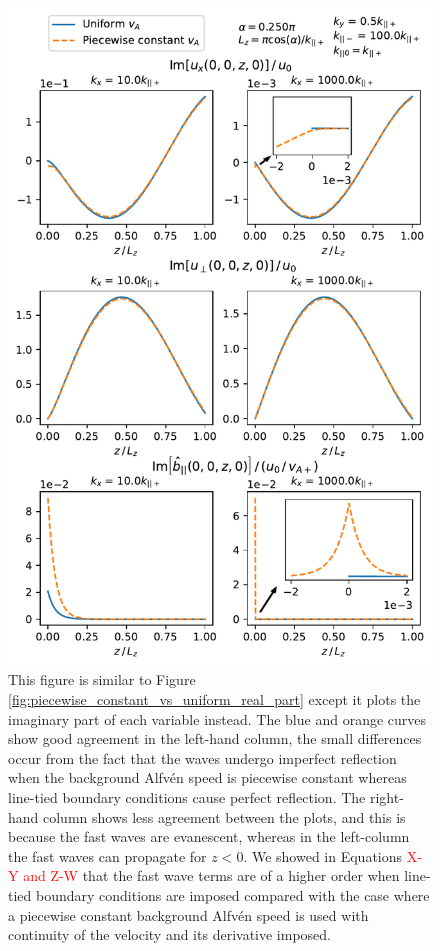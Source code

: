 \begin{figure}
    \centering
    \vspace{-20pt}
    \includegraphics[width=\textwidth,height=0.8\textheight,keepaspectratio]{figures/chapter04/piecewise_constant_vs_uniform_imag_part.pdf}
    \vspace{-10pt}
    \caption{This figure is similar to Figure \ref{fig:piecewise_constant_vs_uniform_real_part} except it plots the imaginary part of each variable instead. The blue and orange curves show good agreement in the left-hand column, the small differences occur from the fact that the waves undergo imperfect reflection when the background Alfv\'en speed is piecewise constant whereas line-tied boundary conditions cause perfect reflection. The right-hand column shows less agreement between the plots, and this is because the fast waves are evanescent, whereas in the left-column the fast waves can propagate for $z<0$. We showed in Equations \textcolor{red}{X-Y and Z-W} that the fast wave terms are of a higher order when line-tied boundary conditions are imposed compared with the case where a piecewise constant background Alfv\'en speed is used with continuity of the velocity and its derivative imposed.}
    \label{fig:piecewise_constant_vs_uniform_imag_part}
    \vspace{-20pt}
\end{figure}

